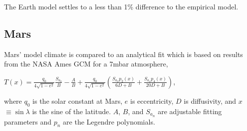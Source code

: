 \documentclass[12pt,onecolumn]{revtex4-2}    %
\begin{document}
The Earth model settles to a less than 1\% difference to the empirical model.

\subsection{Mars}
Mars' model climate is compared to an analytical fit \cite{KH18} which is based on results from the NASA Ames GCM for a 7mbar atmosphere, 

\begin{center}
$T(x) = \frac{q_{0}}{4 \sqrt{1 - e^{2}}} \frac{S_{a_{0}}}{B} - \frac{A}{B} + \frac{q_{0}}{4 \sqrt{1 - e^{2}}} (\frac{S_{a_{2}}p_{2}(x)}{6D+B} + \frac{S_{a_{4}}p_{4}(x)}{20D+B})$,
\end{center}

where $q_{0}$ is the solar constant at Mars, $e$ is eccentricity, $D$ is diffusivity, and $x$ $\equiv \sin\lambda$ is the sine of the latitude. $A$, $B$, and $S_{a_{n}}$ are adjustable fitting parameters and $p_{n}$ are the Legendre polynomials.
\end{document}
